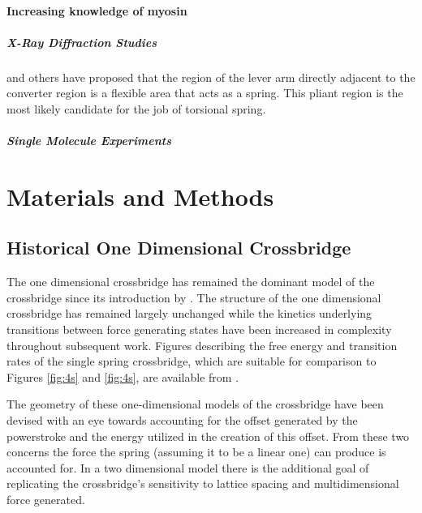 \documentclass[]{article}
\begin{document}
\paragraph*{Increasing knowledge of myosin}

\subparagraph*{X-Ray Diffraction Studies}

\citet{Houdusse:2001:p182} and others have proposed that the region of the lever arm directly adjacent to the converter region is a flexible area that acts as a spring. This pliant region is the most likely candidate for the job of torsional spring. 



\subparagraph*{Single Molecule Experiments}



\section{Materials and Methods}  %

\subsection*{Historical One Dimensional Crossbridge} %
\label{sub:historical_one_dimensional_crossbridge}


The one dimensional crossbridge has remained the dominant model of the crossbridge since its introduction by \citet{Huxley:1957:p255}. 
The structure of the one dimensional crossbridge has remained largely unchanged while the kinetics underlying transitions between force generating states have been increased in complexity throughout subsequent work. \citep{Pate:1989:p181, Daniel:1998:p1611, Chase:2004:p204, Tanner:2007:pe115}
Figures describing the free energy and transition rates of the single spring crossbridge, which are suitable for comparison to Figures \ref{fig:4s} and \ref{fig:4s}, are available from \citet{Tanner:2007:pe115}.

The geometry of these one-dimensional models of the crossbridge have been devised with an eye towards accounting for the offset generated by the powerstroke and the energy utilized in the creation of this offset. 
From these two concerns the force the spring (assuming it to be a linear one) can produce is accounted for. 
In a two dimensional model there is the additional goal of replicating the crossbridge's sensitivity to lattice spacing and multidimensional force generated. 
\end{document}
